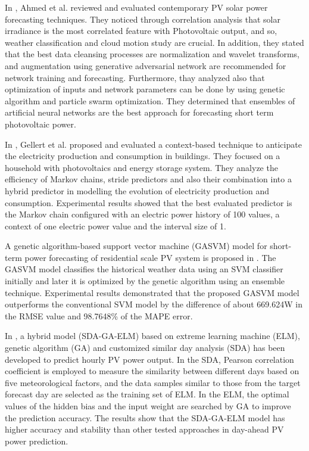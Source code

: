 In \cite{AHMED2020109792}, Ahmed et al. reviewed and evaluated contemporary PV solar power forecasting techniques.
They noticed through correlation analysis that solar irradiance is the most correlated feature with Photovoltaic output, and so, weather classification and cloud motion study are crucial.
In addition, they stated that the best data cleansing processes are normalization and wavelet transforms, and augmentation using generative adversarial network are recommended for network training and forecasting.
Furthermore, thay analyzed also that optimization of inputs and network parameters can be done by using genetic algorithm and particle swarm optimization.
They determined that ensembles of artificial neural networks are the best approach for forecasting short term photovoltaic power.

In \cite{GELLERT2019546}, Gellert et al. proposed and evaluated a context-based technique to anticipate the electricity production and consumption in buildings.
They focused on a household with photovoltaics and energy storage system.
They analyze the efficiency of Markov chains, stride predictors and also their combination into a hybrid predictor in modelling the evolution of electricity production and consumption.
Experimental results showed that the best evaluated predictor is the Markov chain configured with an electric power history of 100 values, a context of one electric power value and the interval size of 1.

A genetic algorithm-based support vector machine (GASVM) model for short-term power forecasting of residential scale PV system is proposed in \cite{VANDEVENTER2019367}.
The GASVM model classifies the historical weather data using an SVM classifier initially and later it is optimized by the genetic algorithm using an ensemble technique.
Experimental results demonstrated that the proposed GASVM model outperforms the conventional SVM model by the difference of about 669.624W in the RMSE value and 98.7648\% of the MAPE error.

In \cite{ZHOU2020117894}, a hybrid model (SDA-GA-ELM) based on extreme learning machine (ELM), genetic algorithm (GA) and customized similar day analysis (SDA) has been developed to predict hourly PV power output.
In the SDA, Pearson correlation coefficient is employed to measure the similarity between different days based on five meteorological factors, and the data samples similar to those from the target forecast day are selected as the training set of ELM.
In the ELM, the optimal values of the hidden bias and the input weight are searched by GA to improve the prediction accuracy.
The results show that the SDA-GA-ELM model has higher accuracy and stability than other tested approaches in day-ahead PV power prediction.

